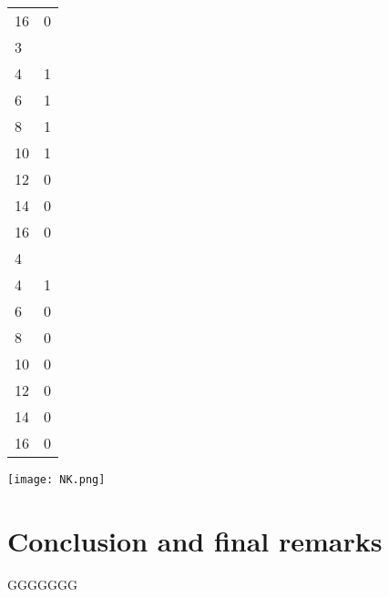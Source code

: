 \documentclass{article}
\begin{document}
\begin{table}[]
\begin{tabular}{ll}
16                                         & 0 \\
3                                          &   \\
4                                          & 1 \\
6                                          & 1 \\
8                                          & 1 \\
10                                         & 1 \\
12                                         & 0 \\
14                                         & 0 \\
16                                         & 0 \\
4                                          &   \\
4                                          & 1 \\
6                                          & 0 \\
8                                          & 0 \\
10                                         & 0 \\
12                                         & 0 \\
14                                         & 0 \\
16                                         & 0
\end{tabular}
\end{table}
\texttt{[image: NK.png]}
\section{Conclusion and final remarks}
GGGGGGG
\end{document}
